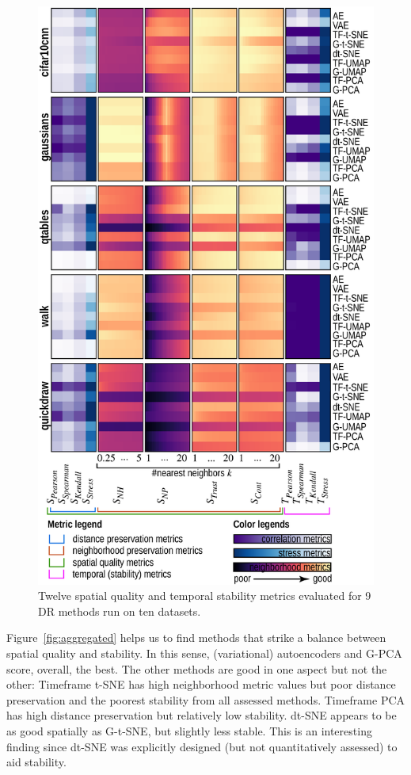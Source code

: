 \begin{figure}[h]\centering
  \vspace{-0.2cm}
  \includegraphics[width=\linewidth]{figures/projection-evaluation/f2-b.png}
  \caption{Twelve spatial quality and temporal stability metrics evaluated for 9 DR  methods run on ten datasets.}
  \vspace{-0.2cm}
  \label{fig:all_datasets_b}
\end{figure}

Figure~\ref{fig:aggregated} helps us to find methods that strike a balance between spatial quality and stability. In this sense, (variational) autoencoders and G-PCA score, overall, the best. The other methods are good in one aspect but not the other: Timeframe t-SNE has high neighborhood metric values but poor distance preservation and the poorest stability from all assessed methods. Timeframe PCA has high distance preservation but relatively low stability. dt-SNE appears to be as good spatially as G-t-SNE, but slightly less stable. This is an interesting finding since dt-SNE was explicitly designed (but not quantitatively assessed) to aid stability.

